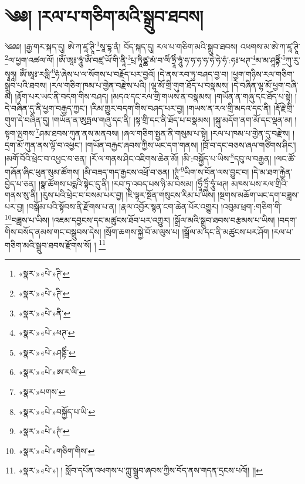 \chapter{༄༅། །རལ་པ་གཅིག་མའི་སྒྲུབ་ཐབས།}༄༅༅། །རྒྱ་གར་སྐད་དུ། ཨེ་ཀ་ཛཱ་ཊཱི་\footnote{«སྣར་»«པེ་»ཊི་}སཱ་དྷ་ནཾ། བོད་སྐད་དུ། རལ་པ་གཅིག་མའི་སྒྲུབ་ཐབས། འཕགས་མ་ཨེ་ཀ་ཛཱ་ཊཱི་\footnote{«སྣར་»«པེ་»ཊི་}ལ་ཕྱག་འཚལ་ལོ། །ཨོཾ་ཨཱཿ་ཧཱུཾ་ཨོཾ་བཛྲ་ཡོ་གི་ནཱི་\footnote{«སྣར་»«པེ་»ནི་}པྲ་ཏཱིཙྪ་མཾ་བ་ལིཾ་ཧྲཱིཾ་ཧཱུཾ་ཧ་ཧ་ཧ་ཧ་ཧེ་ཧེ་ཧཾ་:ཧཿ་ཕཊ་\footnote{«སྣར་»«པེ་»ཕཊ་}མ་མ་ཤཱནྟིཾ་\footnote{«སྣར་»«པེ་»ཤནྟིཾ་}ཀུ་རུ་སྭཱཧཱ། ཨོཾ་ཨཱཿ་རལླི་\footnote{«སྣར་»«པེ་»ཨ་ར་ལི་}ཧཾ་ཞེས་པ་ལ་སོགས་པ་བརྗོད་པར་བྱའོ། །དེ་ནས་རབ་ཏུ་བཤད་བྱ་བ། །ཕྱག་གཉིས་རལ་གཅིག་སྒྲུབ་པའི་ཐབས། །རལ་གཅིག་ཁམ་པ་གྱེན་བརྫེས་པའི། །ལྷ་མོ་གྲི་གུག་ཐོད་པ་བསྣམས། །དེ་བཞིན་ལྷ་མོ་ཕྱག་བཞི་མ། །རྟོག་པར་ཡང་ནི་བདག་གིས་བཤད། །མདའ་དང་རལ་གྲི་གཡས་ན་བསྣམས། །གཡོན་ན་གཞུ་དང་ཐོད་པ་སྟེ། །དེ་བཞིན་དུ་ནི་ཕྱག་བརྒྱད་ཀྱང་། །རིམ་གྱུར་བདག་གིས་བཤད་པར་བྱ། །གཡས་ན་རལ་གྲི་མདའ་དང་ནི། །རྡོ་རྗེ་གྲི་གུག་དེ་བཞིན་དུ། །གཡོན་ན་ཨུཏྤལ་གཞུ་དང་ནི། །སྟ་གྲི་དང་ནི་ཐོད་པ་བསྣམས། །སྐུ་མདོག་ནག་མོ་དང་ལྡན་མ། །སྟག་ལྤགས་\footnote{«སྣར་»པགས་}ཤམ་ཐབས་ཀུན་ནས་མནབས། །ཞལ་གཅིག་སྤྱན་ནི་གསུམ་པ་སྟེ། །རལ་པ་ཁམ་པ་གྱེན་དུ་བརྫེས། །དྲག་མོ་ཀུན་ནས་ལྟོ་བ་འཕྱང་། །གཡོན་བརྐྱང་ཞབས་ཀྱིས་ཡང་དག་གནས། །ཁྲོ་བ་དང་བཅས་ཞལ་གཙིགས་ཤིང་། །མགོ་བོའི་ཕྲེང་བ་འཕྱང་བ་ཅན། །རོ་ལ་གནས་ཤིང་འཇིགས་ཆེན་མོ། །མི་:བསྐྱོད་པ་ཡིས་\footnote{«སྣར་»«པེ་»བསྐྱོད་པ་ཡི་}དབུ་ལ་བརྒྱན། །ལང་ཚོ་གཞོན་ཞིང་ཕུན་སུམ་ཚོགས། །མི་བཟད་གད་རྒྱངས་འཕྲོ་བ་ཅན། །ཊཱཾ་\footnote{«སྣར་»«པེ་»ཊཾ་}ཡིག་ས་བོན་ལས་བྱུང་བ། །དེ་མ་ཐག་རྐྱེན་བྱེད་པ་ཅན། །སྣ་ཚོགས་པདྨའི་སྟེང་དུ་ནི། །རབ་ཏུ་འབད་པས་ཉི་མ་བསམ། །ཧྲཱིཾ་ཏྲཱིཾ་ཧཱུཾ་ཕཊ། མཁས་པས་རལ་གྲིའི་གནས་སུ་ནི། །རུས་པའི་ཕྲེང་བ་བསམ་པར་བྱ། །ཇི་ལྟར་སྔོན་གསུངས་རིམ་པ་ཡིས། །སྔགས་མཆོག་ཡང་དག་བཟླས་པར་བྱ། །བསྒོམ་པའི་སྟོབས་ནི་རྫོགས་པ་ན། །རྣལ་འབྱོར་སྙན་ངག་ཆེན་པོར་འགྱུར། །འབུམ་ཕྲག་:གཅིག་གི་\footnote{«སྣར་»«པེ་»གཅིག་གིས་}བཟླས་པ་ཡིས། །འཇམ་དབྱངས་དང་མཚུངས་ཐོབ་པར་འགྱུར། །སྒྲོལ་མའི་སྒྲུབ་ཐབས་བརྩམས་པ་ཡིས། །བདག་གིས་བསོད་ནམས་གང་བསྒྲུབས་དེས། །སྲོག་ཆགས་སྐྱེ་བོ་མ་ལུས་པ། །སྒྲོལ་མ་དང་ནི་མཚུངས་པར་ཤོག །རལ་པ་གཅིག་མའི་སྒྲུབ་ཐབས་རྫོགས་སོ། ། \footnote{«སྣར་»«པེ་»། ། སློབ་དཔོན་འཕགས་པ་ཀླུ་སྒྲུབ་ཞབས་ཀྱིས་བོད་ནས་གདན་དྲངས་པའོ།། །།}